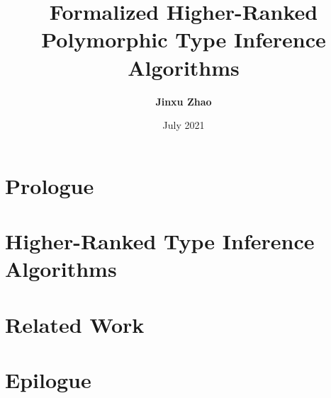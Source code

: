 



\title{Formalized Higher-Ranked Polymorphic Type Inference Algorithms}
\author{\textbf{Jinxu Zhao}}
\date{July 2021}
 



\maketitle

\begin{abstract}
 
\end{abstract}


\frontmatter
\makedeclaration
\makeAck
\tableofcontents
\listoffigures
\listoftables

\mainmatter

\part{Prologue}





\part{Higher-Ranked Type Inference Algorithms}






\part{Related Work}



\part{Epilogue}





\cleardoublepage





